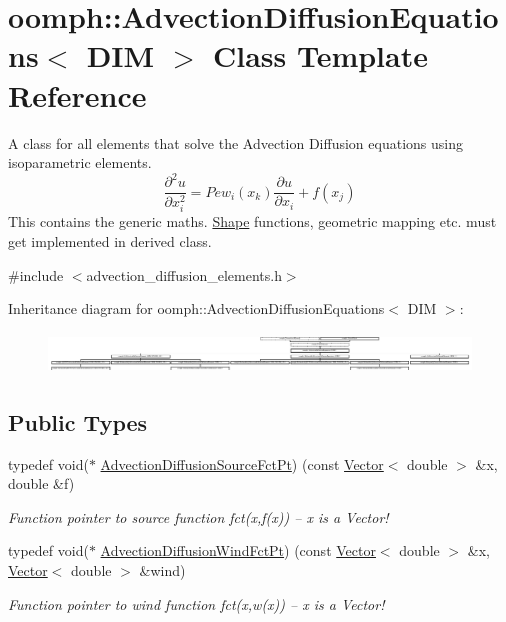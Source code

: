 \hypertarget{classoomph_1_1AdvectionDiffusionEquations}{}\section{oomph\+:\+:Advection\+Diffusion\+Equations$<$ D\+IM $>$ Class Template Reference}
\label{classoomph_1_1AdvectionDiffusionEquations}


A class for all elements that solve the Advection Diffusion equations using isoparametric elements. \[ \frac{\partial^2 u}{\partial x_i^2} = Pe w_i(x_k) \frac{\partial u}{\partial x_i} + f(x_j) \] This contains the generic maths. \hyperlink{classoomph_1_1Shape}{Shape} functions, geometric mapping etc. must get implemented in derived class.  




{\ttfamily \#include $<$advection\+\_\+diffusion\+\_\+elements.\+h$>$}

Inheritance diagram for oomph\+:\+:Advection\+Diffusion\+Equations$<$ D\+IM $>$\+:\begin{figure}[H]
\begin{center}
\leavevmode
\includegraphics[height=1.088435cm]{classoomph_1_1AdvectionDiffusionEquations}
\end{center}
\end{figure}
\subsection*{Public Types}
\begin{DoxyCompactItemize}
\item 
typedef void($\ast$ \hyperlink{classoomph_1_1AdvectionDiffusionEquations_aa892578e0cffe209775da9f5ac84bd03}{Advection\+Diffusion\+Source\+Fct\+Pt}) (const \hyperlink{classoomph_1_1Vector}{Vector}$<$ double $>$ \&x, double \&f)
\begin{DoxyCompactList}\small\item\em Function pointer to source function fct(x,f(x)) -- x is a Vector! \end{DoxyCompactList}\item 
typedef void($\ast$ \hyperlink{classoomph_1_1AdvectionDiffusionEquations_a341db90b2eaf704f3286a9fcde7c614a}{Advection\+Diffusion\+Wind\+Fct\+Pt}) (const \hyperlink{classoomph_1_1Vector}{Vector}$<$ double $>$ \&x, \hyperlink{classoomph_1_1Vector}{Vector}$<$ double $>$ \&wind)
\begin{DoxyCompactList}\small\item\em Function pointer to wind function fct(x,w(x)) -- x is a Vector! \end{DoxyCompactList}\end{DoxyCompactItemize}
